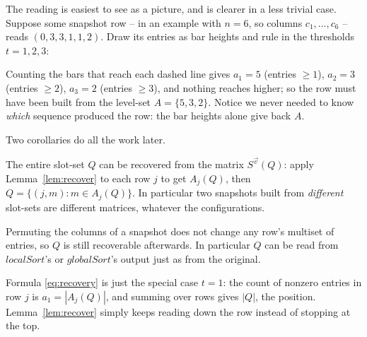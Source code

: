 The reading is easiest to see as a picture, and is clearer in a less trivial case.
Suppose some snapshot row -- in an example with $n=6$, so columns
$c_1,\ldots,c_6$ -- reads $(0,3,3,1,1,2)$.  Draw its entries as bar heights and rule
in the thresholds $t=1,2,3$:
\begin{center}
\end{center}
Counting the bars that reach each dashed line gives $a_1=5$ (entries $\ge1$),
$a_2=3$ (entries $\ge2$), $a_3=2$ (entries $\ge3$), and nothing reaches higher; so
the row must have been built from the level-set $A=\{5,3,2\}$.  Notice we never
needed to know \emph{which} sequence produced the row: the bar heights alone give
back $A$.

Two corollaries do all the work later.

\begin{corollary}\label{cor:wholeQ}
The entire slot-set $Q$ can be recovered from the matrix $S^{\vec v}(Q)$: apply
Lemma~\ref{lem:recover} to each row $j$ to get $A_j(Q)$, then
$Q=\{(j,m):m\in A_j(Q)\}$.  In particular two snapshots built from
\emph{different} slot-sets are different matrices, whatever the configurations.
\end{corollary}

\begin{corollary}\label{cor:survives}
Permuting the columns of a snapshot does not change any row's multiset of entries,
so $Q$ is still recoverable afterwards.  In particular
$Q$ can be read from $localSort$'s or $globalSort$'s output just as from the
original.
\end{corollary}

\noindent Formula \eqref{eq:recovery} is just the special case $t=1$: the count of
nonzero entries in row $j$ is $a_1=|A_j(Q)|$, and summing over rows gives
$|Q|$, the position.  Lemma~\ref{lem:recover} simply keeps reading down the row
instead of stopping at the top.

